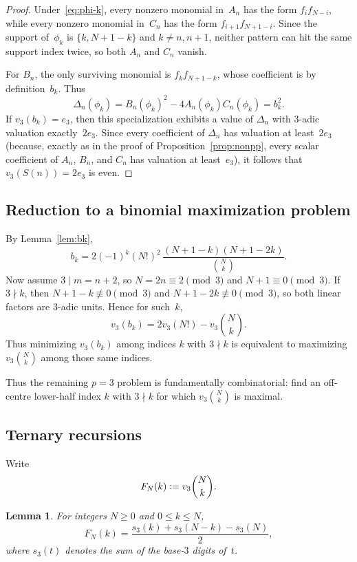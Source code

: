 \documentclass[10pt]{amsart}
\newtheorem{lemma}[theorem]{Lemma}
\theoremstyle{definition}
\theoremstyle{remark}
\newcommand{\defeq}{\vcentcolon=}
\begin{document}
\begin{proof}
Under~\eqref{eq:phi-k}, every nonzero monomial in~$A_n$ has the form
$f_i f_{N-i}$, while every nonzero monomial in~$C_n$ has the form
$f_{i+1}f_{N+1-i}$.  Since the support of~$\phi_k$ is
$\{k,N+1-k\}$ and $k \ne n,n+1$, neither pattern can hit the same support
index twice, so both $A_n$ and $C_n$ vanish.

For $B_n$, the only surviving monomial is $f_k f_{N+1-k}$, whose
coefficient is by definition~$b_k$.  Thus
\[
\Delta_n(\phi_k)=B_n(\phi_k)^2-4A_n(\phi_k)C_n(\phi_k)=b_k^2.
\]
If $v_3(b_k)=e_3$, then this specialization exhibits a value of
$\Delta_n$ with $3$-adic valuation exactly~$2e_3$.  Since every coefficient
of $\Delta_n$ has valuation at least~$2e_3$ (because, exactly as in the
proof of Proposition~\ref{prop:nonpp}, every scalar coefficient of
$A_n$, $B_n$, and $C_n$ has valuation at least~$e_3$), it follows that
$v_3(S(n))=2e_3$ is even.
\end{proof}

\subsection{Reduction to a binomial maximization problem}

By Lemma~\ref{lem:bk},
\[
b_k = 2(-1)^k (N!)^2\,
\frac{(N+1-k)(N+1-2k)}{\binom{N}{k}}.
\]
Now assume $3 \mid m = n+2$, so $N = 2n \equiv 2 \pmod{3}$ and
$N+1 \equiv 0 \pmod{3}$.  If $3 \nmid k$, then
$N+1-k \not\equiv 0 \pmod{3}$ and $N+1-2k \not\equiv 0 \pmod{3}$, so
both linear factors are $3$-adic units.  Hence for such~$k$,
\begin{equation}\label{eq:v3bk-binomial}
v_3(b_k)= 2v_3(N!) - v_3\binom{N}{k}.
\end{equation}
Thus minimizing $v_3(b_k)$ among indices $k$ with $3 \nmid k$ is equivalent
to maximizing $v_3\binom{N}{k}$ among those same indices.

Thus the remaining $p=3$ problem is fundamentally combinatorial: find an
off-centre lower-half index $k$ with $3 \nmid k$ for which
$v_3\binom{N}{k}$ is maximal.

\subsection{Ternary recursions}

Write
\[
F_N(k) \defeq v_3\binom{N}{k}.
\]
\begin{lemma}\label{lem:p3-digit-sum}
For integers $N \ge 0$ and $0 \le k \le N$,
\[
F_N(k)=\frac{s_3(k)+s_3(N-k)-s_3(N)}{2},
\]
where $s_3(t)$ denotes the sum of the base-$3$ digits of~$t$.
\end{lemma}
\end{document}
